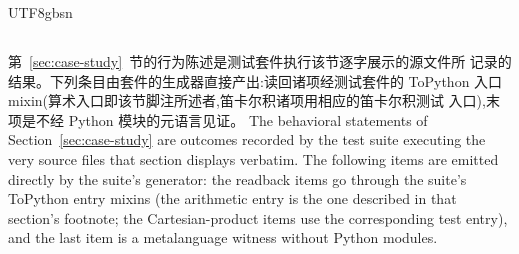 \begin{CJK*}{UTF8}{gbsn}
\subsection{}
\label{app:nat-answers}

\ifPaperChinese
第~\ref{sec:case-study}~节的行为陈述是测试套件执行该节逐字展示的源文件所
记录的结果。下列条目由套件的生成器直接产出:读回诸项经测试套件的 ToPython
入口 mixin(算术入口即该节脚注所述者,笛卡尔积诸项用相应的笛卡尔积测试
入口),末项是不经 Python 模块的元语言见证。
\else
The behavioral statements of Section~\ref{sec:case-study} are
outcomes recorded by the test suite executing the very source files
that section displays verbatim. The following items are emitted
directly by the suite's generator: the readback items go through the
suite's ToPython entry mixins (the arithmetic entry is the one
described in that section's footnote; the Cartesian-product items
use the corresponding test entry), and the last item is a metalanguage witness
without Python modules.
\fi

\begin{breakablepathcommas}
\raggedright

\end{breakablepathcommas}


\end{CJK*}
